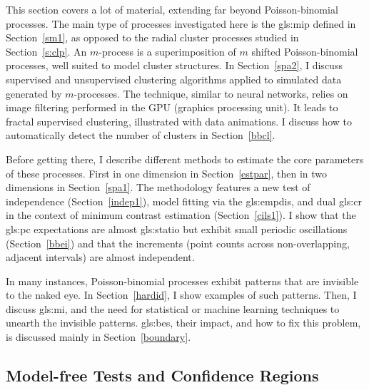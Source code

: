 \documentclass[10pt]{article}
\begin{document}
This section covers a lot of material, extending far beyond Poisson-binomial processes. The main type of processes investigated here is the 
\gls{gls:mip} defined in Section~\ref{sm1},
 as opposed to the radial cluster processes studied in Section~\ref{s:clp}. An $m$-process is a superimposition of $m$ shifted Poisson-binomial processes, well suited to model cluster structures. In Section~\ref{spa2}, I discuss supervised and unsupervised clustering algorithms applied to
simulated data generated by $m$-processes. The technique, similar to \textcolor{index}{neural networks}, relies on 
\textcolor{index}{image filtering} performed in the 
\textcolor{index}{GPU} (graphics processing unit). It leads to 
\textcolor{index}{fractal supervised clustering}, illustrated with
data animations. I discuss how to automatically detect the number of clusters in Section~\ref{bbcl}.

Before getting there, I describe different methods to estimate the core parameters of these processes. First in one dimension in Section~\ref{estpar}, then in two dimensions in Section~\ref{spa1}. 
The methodology features a new test of independence (Section~\ref{indep1}), model fitting via the 
 \gls{gls:empdis}, and 
\textcolor{index}{dual} \gls{gls:cr} in the context of 
\textcolor{index}{minimum contrast estimation}
 (Section~\ref{cils1}). I show that the \gls{gls:pc} expectations are almost 
\gls{gls:statio} but exhibit small periodic oscillations (Section~\ref{bbei}) and that 
the increments (point counts across non-overlapping, adjacent intervals) are almost independent.   

In many instances, Poisson-binomial processes exhibit patterns that are invisible to the naked eye. In Section~\ref{hardid}, I show examples of such patterns. Then, I discuss \gls{gls:mi}, and the need for statistical or machine learning techniques to unearth the invisible patterns. 
\Glspl{gls:be}, their impact, and how to fix this problem, is discussed mainly in Section~\ref{boundary}. 

\subsection{Model-free Tests and Confidence Regions}\label{ci0}
\end{document}
